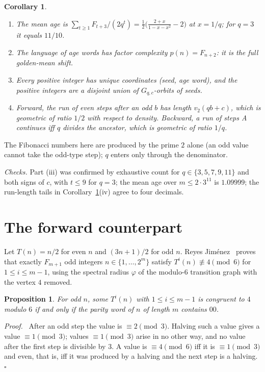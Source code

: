\documentclass[11pt]{article}
\newtheorem{proposition}[theorem]{Proposition}
\newtheorem{corollary}[theorem]{Corollary}
\newenvironment{proof}{\par\noindent\textit{Proof.}\ }{\hfill$\square$\par\medskip}
\begin{document}
\begin{corollary}\label{cor:age}
\begin{enumerate}
\item The mean age is $\sum_{t\ge1}F_{t+3}/(2q^{t})=\tfrac12\bigl(\tfrac{2+x}{1-x-x^{2}}-2\bigr)$ at $x=1/q$; for
$q=3$ it equals $11/10$.
\item The language of age words has factor complexity $p(n)=F_{n+2}$: it is the full golden-mean shift.
\item Every positive integer has unique coordinates (seed, age word), and the positive integers are a disjoint
union of $G_{q,c}$-orbits of seeds.
\item Forward, the run of even steps after an odd $b$ has length $v_2(qb+c)$, which is geometric of ratio $1/2$
with respect to density. Backward, a run of steps A continues iff $q$ divides the ancestor, which is geometric of
ratio $1/q$.
\end{enumerate}
\end{corollary}

The Fibonacci numbers here are produced by the prime $2$ alone (an odd value cannot take the odd-type step);
$q$ enters only through the denominator.

\emph{Checks.} Part (iii) was confirmed by exhaustive count for $q\in\{3,5,7,9,11\}$ and both signs of $c$, with
$t\le 9$ for $q=3$; the mean age over $m\le 2\cdot 3^{11}$ is $1.09999$; the run-length tails in
Corollary~\ref{cor:age}(iv) agree to four decimals.

\section{The forward counterpart}

Let $T(n)=n/2$ for even $n$ and $(3n+1)/2$ for odd $n$. Reyes Jim\'enez~\cite[Theorem 4.7]{RJ} proves that exactly
$F_{m+1}$ odd integers $n\in\{1,\dots,2^{m}\}$ satisfy $T^{i}(n)\not\equiv4\pmod6$ for $1\le i\le m-1$, using the
spectral radius $\varphi$ of the modulo-$6$ transition graph with the vertex $4$ removed.

\begin{proposition}\label{prop:dual}
For odd $n$, some $T^{i}(n)$ with $1\le i\le m-1$ is congruent to $4$ modulo $6$ if and only if the parity word of $n$
of length $m$ contains $00$.
\end{proposition}
\begin{proof}
After an odd step the value is $\equiv2\pmod3$. Halving such a value gives a value $\equiv1\pmod3$; values
$\equiv1\pmod3$ arise in no other way, and no value after the first step is divisible by $3$. A value is
$\equiv4\pmod6$ iff it is $\equiv1\pmod3$ and even, that is, iff it was produced by a halving and the next step is
a halving.
\end{proof}
\end{document}
